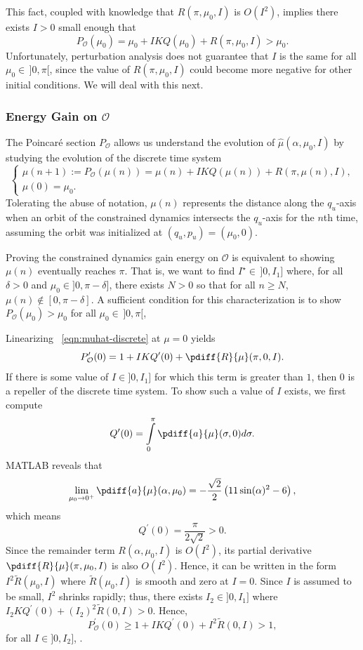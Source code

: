 This fact, coupled with knowledge that \(R(\pi,\mu_0,I)\) is \(O(I^2)\),
implies there exists \(I > 0\) small enough that
\[
    P_\mathcal{O}(\mu_0) = \mu_0 + IKQ(\mu_0) + R(\pi,\mu_0,I) > \mu_0
    .
\]
Unfortunately, perturbation analysis does not guarantee 
that \(I\) is the same for all \(\mu_0 \in \, ]0,\pi[\), since the value of
\(R(\pi,\mu_0,I)\) could become more negative for other initial conditions.
We will deal with this next.

\subsubsection*{Energy Gain on \(\mathcal{O}\)}

The Poincar\'{e} section \(P_\mathcal{O}\) allows us understand the evolution of
\(\hat{\mu}(\alpha,\mu_0,I)\) by studying the evolution of the discrete time
system
\begin{equation}\label{eqn:muhat-discrete}
    \begin{cases}
        \mu(n+1) := P_\mathcal{O}(\mu(n)) 
        = \mu(n) + I K Q(\mu(n)) + R(\pi,\mu(n),I)
        , \\
        \mu(0) = \mu_0
        .
    \end{cases}
\end{equation}
Tolerating the abuse of notation, \(\mu(n)\) represents the distance along the
\(q_u\)-axis when an orbit of the constrained dynamics intersects the
\(q_u\)-axis for the \(n\)th time, assuming the orbit was initialized at
\((q_u,p_u) = (\mu_0,0)\).

Proving the constrained dynamics gain energy on \(\mathcal{O}\) is equivalent to
showing \(\mu(n)\) eventually reaches \(\pi\).
That is, we want to find \(I^\star \in\, ]0, I_1]\) where, for all 
\(\delta > 0\) and \(\mu_0 \in ]0,\pi-\delta]\), there exists \(N > 0\) so that
for all \(n \geq N\), \(\mu(n) \notin [0,\pi-\delta]\).
A sufficient condition for this characterization is to show 
\(P_\mathcal{O}(\mu_0) > \mu_0\) for all \(\mu_0 \in\, ]0,\pi[\),

Linearizing ~\eqref{eqn:muhat-discrete} at \(\mu = 0\) yields
\[
    P^\prime_\mathcal{O}(0) = 1 + I K Q^\prime(0) +
    \pdiff{R}{\mu}(\pi,0,I)
    .
\]
If there is some value of \(I \in ]0,I_1]\) for which this term is greater than
\(1\), then \(0\) is a repeller of the discrete time system.
To show such a value of \(I\) exists, we first compute 
\[
    Q^\prime(0) = \int \limits_0^\pi \pdiff{a}{\mu}(\sigma,0) d\sigma
    .
\]
MATLAB reveals that 
\[
    \lim \limits_{\mu_0 \to 0^+}
    \pdiff{a}{\mu}(\alpha,\mu_0) 
    = -\frac{\sqrt{2}}{2} \left(11\sin(\alpha)^2 - 6\right)
    ,
\]
which means 
\[
    Q^\prime(0)  = \frac{\pi}{2\sqrt{2}} > 0
    .
\]
Since the remainder term \(R(\alpha,\mu_0,I)\) is \(O(I^2)\), 
its partial derivative \(\pdiff{R}{\mu}(\pi,\mu_0,I)\) is also \(O(I^2)\).
Hence, it can be written in the form
\(I^2 \tilde{R}(\mu_0,I)\) where \(\tilde{R}(\mu_0,I)\) is smooth and
zero at \(I = 0\).
Since \(I\) is assumed to be small, \(I^2\) shrinks rapidly;
thus, there exists \(I_2 \in ]0,I_1]\) where 
\(I_2 K Q^\prime(0) + (I_2)^2 \tilde{R}(0,I) > 0\).
Hence,
\[
    P^\prime_\mathcal{O}(0) \geq 1 + IKQ^\prime(0) + I^2 \tilde{R}(0,I) 
    > 1
    ,
\] 
for all \(I \in ]0, I_2]\), .

